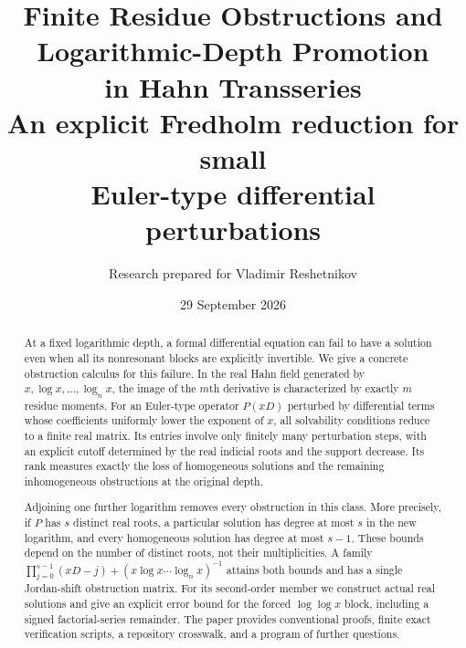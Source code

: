 \documentclass[11pt,a4paper]{article}
\title{\textbf{Finite Residue Obstructions and\\Logarithmic-Depth Promotion\\in Hahn Transseries}\\[0.6em]
\large An explicit Fredholm reduction for small\\Euler-type differential perturbations}
\author{Research prepared for Vladimir Reshetnikov}
\date{29 September 2026}
\numberwithin{equation}{section}
\theoremstyle{definition}
\theoremstyle{remark}
\begin{document}
\maketitle
\thispagestyle{empty}
\begin{abstract}
At a fixed logarithmic depth, a formal differential equation can fail to have a solution even when all its nonresonant blocks are explicitly invertible. We give a concrete obstruction calculus for this failure. In the real Hahn field generated by $x,\log x,\ldots,\log_n x$, the image of the $m$th derivative is characterized by exactly $m$ residue moments. For an Euler-type operator $P(xD)$ perturbed by differential terms whose coefficients uniformly lower the exponent of $x$, all solvability conditions reduce to a finite real matrix. Its entries involve only finitely many perturbation steps, with an explicit cutoff determined by the real indicial roots and the support decrease. Its rank measures exactly the loss of homogeneous solutions and the remaining inhomogeneous obstructions at the original depth.

Adjoining one further logarithm removes every obstruction in this class. More precisely, if $P$ has $s$ distinct real roots, a particular solution has degree at most $s$ in the new logarithm, and every homogeneous solution has degree at most $s-1$. These bounds depend on the number of distinct roots, not their multiplicities. A family $\prod_{j=0}^{s-1}(xD-j)+(x\log x\cdots\log_n x)^{-1}$ attains both bounds and has a single Jordan-shift obstruction matrix. For its second-order member we construct actual real solutions and give an explicit error bound for the forced $\log\log x$ block, including a signed factorial-series remainder. The paper provides conventional proofs, finite exact verification scripts, a repository crosswalk, and a program of further questions.
\end{abstract}
\vfill
\noindent{}
\clearpage
\setcounter{tocdepth}{1}
\tableofcontents
\vspace{1.2em}
\end{document}
